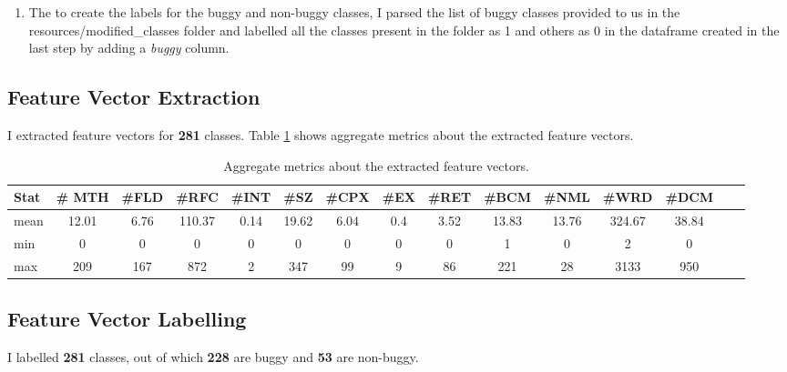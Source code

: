 \documentclass{article}
\newcommand\templateInstruction[1]{
\hl{#1}
}
\begin{document}
\begin{enumerate}
    \item The to create the labels for the buggy and non-buggy classes, 
    I parsed the list of buggy classes provided to us in the resources\//modified\_classes folder 
    and labelled all the classes present in the folder as 1 and others as 0 in the dataframe created in the last step by adding a \textit{buggy} column.
\end{enumerate}

\subsection{Feature Vector Extraction}
I extracted feature vectors for \textbf{281} classes. 
Table \ref{tab:agg_metrics} shows aggregate metrics about the extracted feature vectors.

\begin{table}[]
    \centering
    \begin{adjustbox}{width=1.25\textwidth}
    \begin{tabular}{lcccccccccccccc}
        \hline
        \textbf{Stat} &\textbf{\# MTH} & \textbf{\#FLD} & \textbf{\#RFC} & \textbf{\#INT} & \textbf{\#SZ} & \textbf{\#CPX} & \textbf{\#EX} & \textbf{\#RET} & \textbf{\#BCM} & \textbf{\#NML} & \textbf{\#WRD} & \textbf{\#DCM}\\
        \hline\hline
        {mean} & {12.01} & {6.76} & {110.37} & {0.14} & {19.62} & {6.04} & {0.4} & {3.52} & {13.83} & {13.76} & {324.67} & {38.84}\\
        {min} & {0} & {0} & {0} & {0} & {0} & {0} & {0} & {0} & {1} & {0} & {2} & {0}\\
        {max} & {209} & {167} & {872} & {2} & {347} & {99} & {9} & {86} & {221} & {28} & {3133} & {950}\\
        \hline
    \end{tabular}
    \end{adjustbox}
    \caption{Aggregate metrics about the extracted feature vectors.}
    \label{tab:agg_metrics}
\end{table}


\subsection{Feature Vector Labelling}
I labelled \textbf{281} classes, out of which \textbf{228} are buggy and \textbf{53} are non-buggy.
\end{document}
